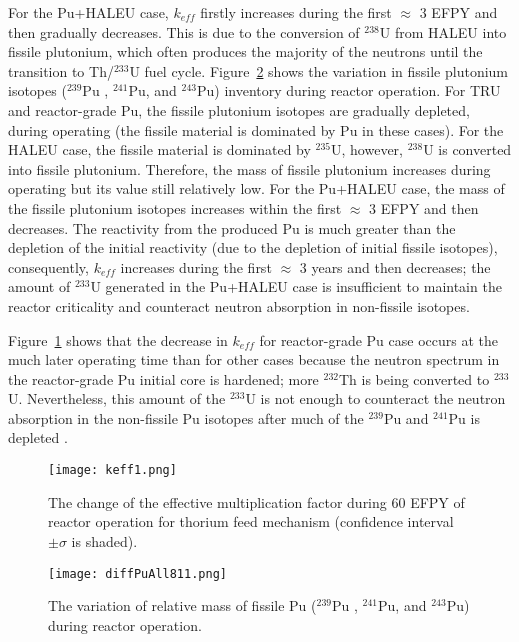 For the Pu+HALEU case, $k_{eff}$ firstly increases during the first $\approx$ 
$3$ EFPY and then gradually decreases. This is due to the conversion of 
$^{238}$U from HALEU into fissile plutonium, which often produces the majority 
of the neutrons until the transition to Th/$^{233}$U fuel cycle. 
Figure~\ref{fig:diffPuAll811} shows the variation in fissile plutonium 
isotopes ($^{239}$Pu , $^{241}$Pu, and $^{243}$Pu) inventory during reactor 
operation. For TRU and reactor-grade Pu, the fissile plutonium isotopes are 
gradually depleted, during operating (the fissile material is dominated by Pu 
in these cases). For the HALEU case, the fissile material is dominated by 
$^{235}$U, however, $^{238}$U is converted into fissile plutonium. Therefore, 
the mass of fissile plutonium increases during operating but its value still 
relatively low. For the Pu+HALEU case, the mass of the fissile plutonium 
isotopes 
increases within the first $\approx$ $3$ EFPY and then decreases. The 
reactivity from the produced Pu is much greater than the depletion of the 
initial reactivity (due to the depletion of initial fissile isotopes), 
consequently, $k_{eff}$ increases during the first $\approx$ $3$ years and 
then decreases; the amount of $^{233}$U generated in the Pu+HALEU case is 
insufficient to maintain the reactor criticality and counteract neutron 
absorption in non-fissile isotopes.

Figure~\ref{fig:keff1} shows that the decrease in $k_{eff}$ for reactor-grade Pu case occurs at the much later operating time than for other cases because the neutron spectrum in the reactor-grade Pu initial core is hardened; more $^{232}$Th is being converted to $^{233}$U. Nevertheless, this amount of the $^{233}$U is not enough to counteract the neutron absorption in the non-fissile Pu isotopes after much of the $^{239}$Pu and $^{241}$Pu is depleted \cite{betzler2016modeling}.



\begin{figure}
	\centering
	\texttt{[image: keff1.png]}
	\vspace{-0.5in}
	\caption{The change of the effective multiplication factor during 60 \gls{EFPY} of reactor operation for thorium feed mechanism (confidence interval $\pm\sigma$ is shaded).} 
	\label{fig:keff1}
\end{figure}

\begin{figure}
	\centering
	\texttt{[image: diffPuAll811.png]}
	\vspace{-0.5in}
	\caption{The variation of relative mass of fissile Pu ($^{239}$Pu , $^{241}$Pu, and $^{243}$Pu) during reactor operation.} 
	\label{fig:diffPuAll811}
\end{figure}

